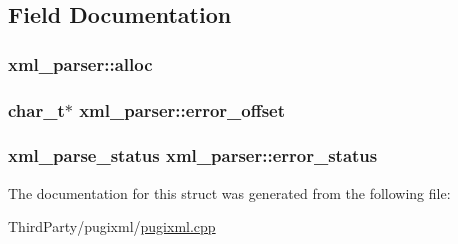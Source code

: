 \subsection{Field Documentation}
\hypertarget{structxml__parser_a213cf019cbf45f5049acdcae296a2976}{
\subsubsection[{alloc}]{ xml\-\_\-parser\-::alloc}}\label{structxml__parser_a213cf019cbf45f5049acdcae296a2976}
\hypertarget{structxml__parser_a2476a71cd7e67b3f4bdbcd1323524503}{
\subsubsection[{error\-\_\-offset}]{\setlength{\rightskip}{0pt plus 5cm}char\-\_\-t$\ast$ xml\-\_\-parser\-::error\-\_\-offset}}\label{structxml__parser_a2476a71cd7e67b3f4bdbcd1323524503}
\hypertarget{structxml__parser_a0555859911674e5a7a349447d6533383}{
\subsubsection[{error\-\_\-status}]{\setlength{\rightskip}{0pt plus 5cm}xml\-\_\-parse\-\_\-status xml\-\_\-parser\-::error\-\_\-status}}\label{structxml__parser_a0555859911674e5a7a349447d6533383}


The documentation for this struct was generated from the following file\-:\begin{DoxyCompactItemize}
\item 
Third\-Party/pugixml/\hyperlink{pugixml_8cpp}{pugixml.\-cpp}\end{DoxyCompactItemize}
